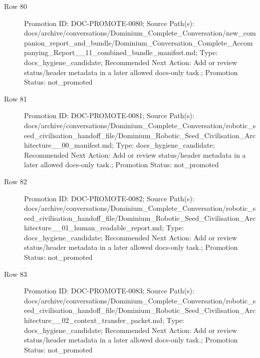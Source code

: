 \documentclass[9pt,a4paper,openany]{book}
\begin{document}
\begin{description}
\item[Row 80] Promotion ID: DOC-\allowbreak{}PROMOTE-\allowbreak{}0080; Source Path(s): docs/\allowbreak{}archive/\allowbreak{}conversations/\allowbreak{}Dominium\_\allowbreak{}Complete\_\allowbreak{}Conversation/\allowbreak{}new\_\allowbreak{}companion\_\allowbreak{}report\_\allowbreak{}and\_\allowbreak{}bundle/\allowbreak{}Dominium\_\allowbreak{}Conversation\_\allowbreak{}Complete\_\allowbreak{}Accompanying\_\allowbreak{}Report\_\allowbreak{}\_\allowbreak{}11\_\allowbreak{}combined\_\allowbreak{}bundle\_\allowbreak{}manifest.\allowbreak{}md; Type: docs\_\allowbreak{}hygiene\_\allowbreak{}candidate; Recommended Next Action: Add or review status/\allowbreak{}header metadata in a later allowed docs-\allowbreak{}only task.\allowbreak{}; Promotion Status: not\_\allowbreak{}promoted
\item[Row 81] Promotion ID: DOC-\allowbreak{}PROMOTE-\allowbreak{}0081; Source Path(s): docs/\allowbreak{}archive/\allowbreak{}conversations/\allowbreak{}Dominium\_\allowbreak{}Complete\_\allowbreak{}Conversation/\allowbreak{}robotic\_\allowbreak{}seed\_\allowbreak{}civilisation\_\allowbreak{}handoff\_\allowbreak{}file/\allowbreak{}Dominium\_\allowbreak{}Robotic\_\allowbreak{}Seed\_\allowbreak{}Civilisation\_\allowbreak{}Architecture\_\allowbreak{}\_\allowbreak{}00\_\allowbreak{}manifest.\allowbreak{}md; Type: docs\_\allowbreak{}hygiene\_\allowbreak{}candidate; Recommended Next Action: Add or review status/\allowbreak{}header metadata in a later allowed docs-\allowbreak{}only task.\allowbreak{}; Promotion Status: not\_\allowbreak{}promoted
\item[Row 82] Promotion ID: DOC-\allowbreak{}PROMOTE-\allowbreak{}0082; Source Path(s): docs/\allowbreak{}archive/\allowbreak{}conversations/\allowbreak{}Dominium\_\allowbreak{}Complete\_\allowbreak{}Conversation/\allowbreak{}robotic\_\allowbreak{}seed\_\allowbreak{}civilisation\_\allowbreak{}handoff\_\allowbreak{}file/\allowbreak{}Dominium\_\allowbreak{}Robotic\_\allowbreak{}Seed\_\allowbreak{}Civilisation\_\allowbreak{}Architecture\_\allowbreak{}\_\allowbreak{}01\_\allowbreak{}human\_\allowbreak{}readable\_\allowbreak{}report.\allowbreak{}md; Type: docs\_\allowbreak{}hygiene\_\allowbreak{}candidate; Recommended Next Action: Add or review status/\allowbreak{}header metadata in a later allowed docs-\allowbreak{}only task.\allowbreak{}; Promotion Status: not\_\allowbreak{}promoted
\item[Row 83] Promotion ID: DOC-\allowbreak{}PROMOTE-\allowbreak{}0083; Source Path(s): docs/\allowbreak{}archive/\allowbreak{}conversations/\allowbreak{}Dominium\_\allowbreak{}Complete\_\allowbreak{}Conversation/\allowbreak{}robotic\_\allowbreak{}seed\_\allowbreak{}civilisation\_\allowbreak{}handoff\_\allowbreak{}file/\allowbreak{}Dominium\_\allowbreak{}Robotic\_\allowbreak{}Seed\_\allowbreak{}Civilisation\_\allowbreak{}Architecture\_\allowbreak{}\_\allowbreak{}02\_\allowbreak{}context\_\allowbreak{}transfer\_\allowbreak{}packet.\allowbreak{}md; Type: docs\_\allowbreak{}hygiene\_\allowbreak{}candidate; Recommended Next Action: Add or review status/\allowbreak{}header metadata in a later allowed docs-\allowbreak{}only task.\allowbreak{}; Promotion Status: not\_\allowbreak{}promoted

\end{description}
\end{document}
